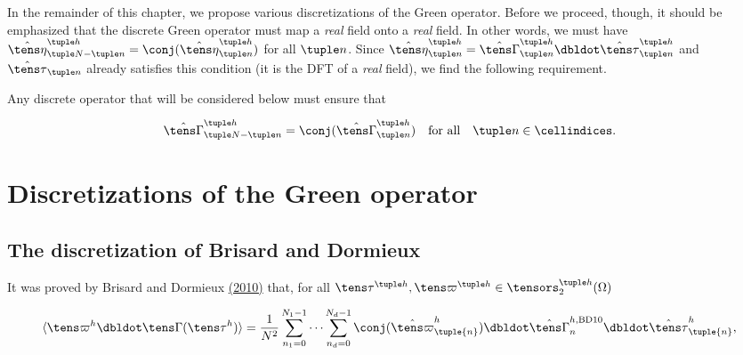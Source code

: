 \documentclass[oneside]{memoir}
\begin{document}
In the remainder of this chapter, we propose various discretizations of the Green operator. Before we proceed, though, it should be emphasized that the discrete Green operator must map a \emph{real} field onto a \emph{real} field. In other words, we must have \(\hat{\tens\eta}_{\tuple N-\tuple n}^{\tuple h}=\conj(\hat{\tens\eta}_{\tuple n}^{\tuple h})\) for all \(\tuple n\). Since \(\hat{\tens\eta}_{\tuple n}^{\tuple h} =\hat{\tens\Gamma}_{\tuple n}^{\tuple h}\dbldot\hat{\tens\tau}_{\tuple n}^{\tuple h}\) and \(\hat{\tens\tau}_{\tuple n}\) already satisfies this condition (it is the DFT of a \emph{real} field), we find the following requirement.



Any discrete operator that will be considered below must ensure that



\begin{equation*}
\begin{split}\hat{\tens\Gamma}_{\tuple N-\tuple n}^{\tuple h}
=\conj(\hat{\tens\Gamma}_{\tuple n}^{\tuple h})
\quad\text{for all}\quad\tuple n\in\cellindices.\end{split}\end{equation*}


\hypertarget{11094457950407373392}{}


\section{Discretizations of the Green operator}



\hypertarget{11847327408909839613}{}


\subsection{The discretization of Brisard and Dormieux}



It was proved by Brisard and Dormieux \hyperlink{17188227464826042090}{(2010)} that, for all \(\tens\tau^{\tuple h}, \tens\varpi^{\tuple h}\in\tensors_2^{\tuple h}(\Omega)\)



\begin{equation*}
\begin{split}\langle\tens\varpi^h\dbldot\tens\Gamma(\tens\tau^h)\rangle=\frac1{N^2}
\sum_{n_1=0}^{N_1-1}\cdots\sum_{n_d=0}^{N_d-1}\conj(\hat{\tens\varpi}_
{\tuple{n}}^h)\dbldot\hat{\tens\Gamma}_n^{h, \mathrm{BD10}}\dbldot
\hat{\tens\tau}_{\tuple{n}}^h,\end{split}\end{equation*}
\end{document}
